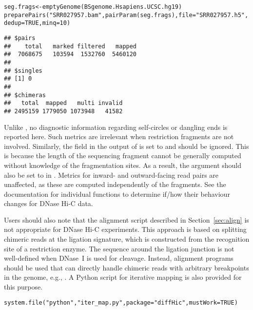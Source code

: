 \documentclass{report}\usepackage[]{graphicx}\usepackage[usenames,dvipsnames]{color}
\newcommand{\hlnum}[1]{\textcolor[rgb]{0.816,0.125,0.439}{#1}}%
\newcommand{\hlstr}[1]{\textcolor[rgb]{0.251,0.627,0.251}{#1}}%
\newcommand{\hlstd}[1]{\textcolor[rgb]{0.251,0.251,0.251}{#1}}%
\newcommand{\hlkwb}[1]{\textcolor[rgb]{0,0,0}{#1}}%
\newcommand{\hlkwc}[1]{\textcolor[rgb]{0.251,0.251,0.251}{#1}}%
\newcommand{\hlkwd}[1]{\textcolor[rgb]{0.878,0.439,0.125}{#1}}%
\newenvironment{knitrout}{}{} %
\begin{document}
\begin{knitrout}
\color{fgcolor}\begin{kframe}
\begin{alltt}
\hlstd{seg.frags} \hlkwb{<-} \hlkwd{emptyGenome}\hlstd{(BSgenome.Hsapiens.UCSC.hg19)}
\hlkwd{preparePairs}\hlstd{(}\hlstr{"SRR027957.bam"}\hlstd{,} \hlkwd{pairParam}\hlstd{(seg.frags),} \hlkwc{file}\hlstd{=}\hlstr{"SRR027957.h5"}\hlstd{,}
             \hlkwc{dedup}\hlstd{=}\hlnum{TRUE}\hlstd{,} \hlkwc{minq}\hlstd{=}\hlnum{10}\hlstd{)}
\end{alltt}
\begin{verbatim}
## $pairs
##    total   marked filtered   mapped 
##  7068675   103594  1532760  5460120 
## 
## $singles
## [1] 0
## 
## $chimeras
##   total  mapped   multi invalid 
## 2495159 1779050 1073948   41582
\end{verbatim}
\end{kframe}
\end{knitrout}

Unlike , no diagnostic information regarding self-circles or dangling ends is reported here.
Such metrics are irrelevant when restriction fragments are not involved.
Similarly, the  field in the output of  is set to  and should be ignored.
This is because the length of the sequencing fragment cannot be generally computed without knowledge of the fragmentation sites.
As a result, the  argument should also be set to  in .
Metrics for inward- and outward-facing read pairs are unaffected, as these are computed independently of the fragments.
See the documentation for individual functions to determine if/how their behaviour changes for DNase Hi-C data.

Users should also note that the alignment script described in Section~\ref{sec:align} is not appropriate for DNase Hi-C experiments.
This approach is based on splitting chimeric reads at the ligation signature, which is constructed from the recognition site of a restriction enzyme.
The sequence around the ligation junction is not well-defined when DNase~I is used for cleavage.
Instead, alignment programs should be used that can directly handle chimeric reads with arbitrary breakpoints in the genome, e.g.,  \cite{li2010fast}.
A Python script for iterative mapping \cite{imakaev2012iterative} is also provided for this purpose.

\begin{knitrout}
\color{fgcolor}\begin{kframe}
\begin{alltt}
\hlkwd{system.file}\hlstd{(}\hlstr{"python"}\hlstd{,} \hlstr{"iter_map.py"}\hlstd{,} \hlkwc{package}\hlstd{=}\hlstr{"diffHic"}\hlstd{,} \hlkwc{mustWork}\hlstd{=}\hlnum{TRUE}\hlstd{)}
\end{alltt}
\end{kframe}
\end{knitrout}
\end{document}
